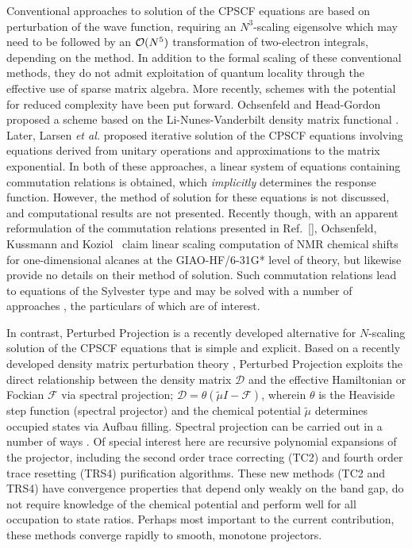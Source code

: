 \documentclass[prl,twocolumn,showpacs,twocolumngrid,superbib]{revtex4}
\begin{document}
Conventional approaches to solution of the CPSCF equations 
\cite{HSekino86,SKarna91,JPople79} are based on perturbation of the wave 
function, requiring an $N^3$-scaling eigensolve which may need to be followed by an ${\cal O}(N^5)$ 
transformation of two-electron integrals, depending on the method. 
In addition to the formal scaling of these conventional methods, they do not admit exploitation 
of quantum locality through the effective use of sparse matrix algebra.  
More recently, schemes with the potential for reduced complexity have been put forward.
Ochsenfeld and Head-Gordon proposed a scheme based on the Li-Nunes-Vanderbilt 
density matrix functional \cite{Ochsenfeld97}.  Later, Larsen {\em et al.} \cite{HLarsen01a} 
proposed iterative solution of the CPSCF equations involving equations derived from 
unitary operations and approximations to the matrix exponential.    In both of these approaches, 
a linear system of equations containing commutation relations is obtained, which {\em implicitly}
determines the response function.  However, the method of solution for these equations
is not discussed, and computational results are not presented.  Recently though, 
with an apparent reformulation of the commutation relations presented in Ref.~[],
Ochsenfeld, Kussmann and Koziol~\cite{COchsenfeld04} claim linear scaling computation
of NMR chemical shifts for one-dimensional alcanes at the GIAO-HF/6-31G* level of theory,
but likewise provide no details on their method of solution.  Such commutation relations 
lead to equations of the Sylvester type and may be solved with a number of approaches \cite{JBrandts01}, 
the particulars of which are of interest. 

In contrast, Perturbed Projection \cite{VWeber04} is a recently developed alternative 
for $N$-scaling solution of the CPSCF equations that is simple and explicit.  Based on a recently developed density 
matrix perturbation theory \cite{ANiklasson04}, Perturbed Projection exploits the direct
relationship between the density matrix $\mathcal{D}$ and the effective Hamiltonian or 
Fockian $\mathcal{F}$ via spectral projection; $\mathcal{D}=\theta(\tilde{\mu}I-\mathcal{F})$, 
wherein $\theta$ is the Heaviside step function (spectral projector)  and the chemical potential 
$\tilde{\mu}$ determines occupied states via Aufbau filling.   Spectral projection can be carried 
out in a number of ways \cite{ANiklasson02A,ANiklasson03,RMcWeeny60,WClinton69,APalser98,GBeylkin99,KNemeth00,AHolas01}.
Of special interest here are recursive polynomial expansions of the projector, including the second 
order trace correcting (TC2) \cite{ANiklasson02A} and fourth order trace resetting (TRS4) 
\cite{ANiklasson03} purification algorithms.  These new methods (TC2 and TRS4) have convergence 
properties that depend only weakly on the band gap, do not require knowledge of the chemical potential 
and perform well for all occupation to state ratios. 
Perhaps most important to the current contribution, these methods converge rapidly to smooth, 
monotone projectors.
\end{document}
